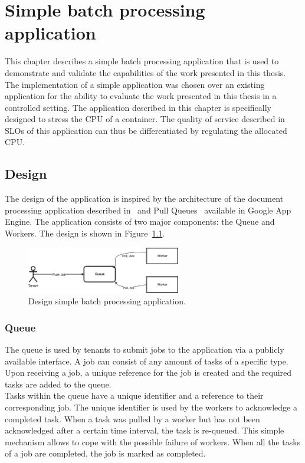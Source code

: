 \chapter{Simple batch processing application}
\label{chapter_app}


This chapter describes a simple batch processing application that is used to demonstrate and validate the capabilities of the work presented in this thesis. The implementation of a simple application was chosen over an existing application for the ability to evaluate the work presented in this thesis in a controlled setting. The application described in this chapter is specifically designed to stress the CPU of a container. The quality of service described in SLOs of this application can thus be differentiated by regulating the allocated CPU.

\section{Design}
The design of the application is inspired by the architecture of the document processing application described in~\cite{Walraven2015b} and Pull Queues~\cite{pullqueue} available in Google App Engine.  The application consists of two major components: the Queue and Workers. The design is shown in Figure~\ref{fig:application1}.
\begin{figure}
    \centering
    \includegraphics[width=0.6\textwidth]{chapter-artificial-application/queue1.pdf}
    \caption{Design simple batch processing application.}
    \label{fig:application1}
\end{figure}

\subsection{Queue}
The queue is used by tenants to submit jobs to the application via a publicly available interface. A job can consist of any amount of tasks of a specific type. Upon receiving a job, a unique reference for the job is created and the required tasks are added to the queue.\\
Tasks within the queue have a unique identifier and a reference to their corresponding job. The unique identifier is used by the workers to acknowledge a completed task. When a task was pulled by a worker but has not been acknowledged after a certain time interval, the task is re-queued. This simple mechanism allows to cope with the possible failure of workers. When all the tasks of a job are completed, the job is marked as completed. 

